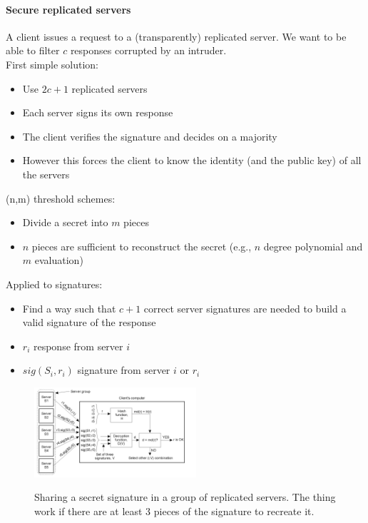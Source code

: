 \documentclass[10pt,a4paper]{article}
\begin{document}
\paragraph{Secure replicated servers}
A client issues a request to a (transparently) replicated server. We want to be able to filter $c$ responses corrupted by an intruder. \\ First simple solution:
\begin{itemize}
	\item Use $2c+1$ replicated servers
	\item Each server signs its own response
	\item The client verifies the signature and decides on a majority
	\item However this forces the client to know the identity (and the public key) of all the servers
\end{itemize}
(n,m) threshold schemes:
\begin{itemize}
	\item Divide a secret into $m$ pieces
	\item $n$ pieces are sufficient to reconstruct the secret (e.g., $n$ degree polynomial and $m$ evaluation)
\end{itemize}
Applied to signatures:
\begin{itemize}
	\item Find a way such that $c+1$ correct server signatures are needed to build a valid signature of the response
	\item $r_i$ response from server $i$
	\item $sig(S_i,r_i)$ signature from server $i$ or $r_i$
\end{itemize}
\begin{figure}[h!]\hfill \includegraphics[width=170pt]{images/secure-replicated.png}\hspace*{\fill}
  \label{fig:secure-replicated}
  \caption{Sharing a secret signature in a group of replicated servers. The thing work if there are at least 3 pieces of the signature to recreate it.}
\end{figure}
\end{document}
